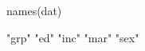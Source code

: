 \begin{Schunk}
\begin{Sinput}
  names(dat)
\end{Sinput}
\begin{Soutput}
[1] "grp" "ed"  "inc" "mar" "sex"
\end{Soutput}
\end{Schunk}
